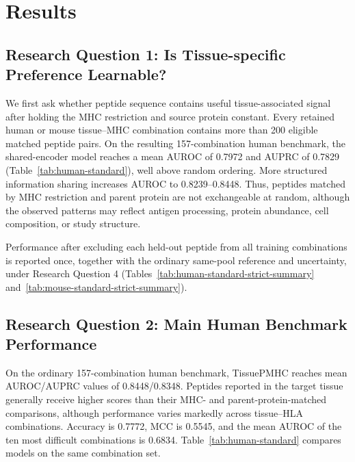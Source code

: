 \section{Results}

\subsection{Research Question 1: Is Tissue-specific Preference Learnable?}

We first ask whether peptide sequence contains useful tissue-associated signal after holding the MHC restriction and source protein constant. Every retained human or mouse tissue--MHC combination contains more than 200 eligible matched peptide pairs. On the resulting 157-combination human benchmark, the shared-encoder model reaches a mean AUROC of 0.7972 and AUPRC of 0.7829 (Table~\ref{tab:human-standard}), well above random ordering. More structured information sharing increases AUROC to 0.8239--0.8448. Thus, peptides matched by MHC restriction and parent protein are not exchangeable at random, although the observed patterns may reflect antigen processing, protein abundance, cell composition, or study structure.

Performance after excluding each held-out peptide from all training combinations is reported once, together with the ordinary same-pool reference and uncertainty, under Research Question 4 (Tables~\ref{tab:human-standard-strict-summary} and~\ref{tab:mouse-standard-strict-summary}).

\subsection{Research Question 2: Main Human Benchmark Performance}

On the ordinary 157-combination human benchmark, TissuePMHC reaches mean AUROC/AUPRC values of 0.8448/0.8348. Peptides reported in the target tissue generally receive higher scores than their MHC- and parent-protein-matched comparisons, although performance varies markedly across tissue--HLA combinations. Accuracy is 0.7772, MCC is 0.5545, and the mean AUROC of the ten most difficult combinations is 0.6834. Table~\ref{tab:human-standard} compares models on the same combination set.

